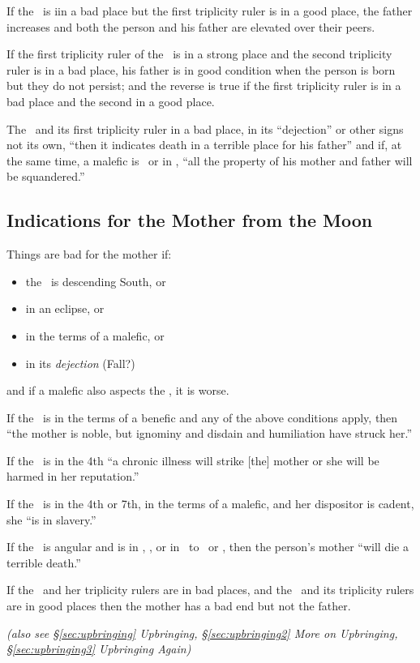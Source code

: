 \noindent If the \Sun\, is iin a bad place but the first triplicity ruler is in a good place, the father increases and both the person and his father are elevated over their peers.

If the first triplicity ruler of the \Sun\, is in a strong place and the second triplicity ruler is in a bad place, his father is in good condition when the person is born but they do not persist; and the reverse is  true if the first triplicity ruler is in a bad place and the second in a good place.

The \Sun\, and its first triplicity ruler in a bad place, in its ``dejection'' or other signs not its own, ``then it indicates death in a terrible place for his father'' and if, at the same time, a malefic is \Square\, or in \Opposition, ``all the property of his mother and father will be squandered.''

\subsection{Indications for the Mother from the Moon}
Things are bad for the mother if:
\begin{itemize}[topsep=0em, itemsep=0em]
\item the \Moon\, is descending South, or
\item in an eclipse, or
\item in the terms of a malefic, or
\item in its \textsl{dejection} (Fall?)
\end{itemize}
and if a malefic also aspects the \Moon, it is worse.

If the \Moon\, is in the terms of a benefic and any of the above conditions apply, then ``the mother is noble, but ignominy and disdain and humiliation have struck her.''

If the \Moon\, is in the 4th ``a chronic illness will strike [the] mother or she will be harmed in her reputation.''

If the \Moon\, is in the 4th or 7th, in the terms of a malefic, and her dispositor is cadent, she ``is in slavery.''

If the \Moon\, is angular and is in \Conjunction, \Square, or in \Opposition\, to \Saturn\, or \Mars, then the person's mother ``will die a terrible death.''

If the \Moon\, and her triplicity rulers are in bad places, and the \Sun\, and its triplicity rulers are in good places then the mother has a bad end but not the father.

\textsl{\small(also see \S\ref{sec:upbringing} Upbringing, \S\ref{sec:upbringing2} More on Upbringing, \S\ref{sec:upbringing3} Upbringing Again)}